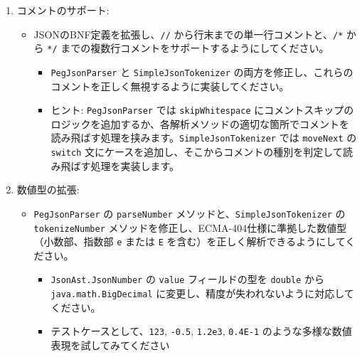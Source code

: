\begin{enumerate}
\item
  コメントのサポート:

\begin{itemize}
\item
  JSONのBNF定義を拡張し、\texttt{//}
  から行末までの単一行コメントと、\texttt{/*} から \texttt{*/}
  までの複数行コメントをサポートするようにしてください。

  \begin{itemize}
  \item
    \texttt{PegJsonParser} と \texttt{SimpleJsonTokenizer}
    の両方を修正し、これらのコメントを正しく無視するように実装してください。
  \item
    ヒント: \texttt{PegJsonParser} では \texttt{skipWhitespace}
    にコメントスキップのロジックを追加するか、各解析メソッドの適切な箇所でコメントを読み飛ばす処理を挟みます。\texttt{SimpleJsonTokenizer}
    では \texttt{moveNext} の \texttt{switch}
    文にケースを追加し、そこからコメントの種別を判定して読み飛ばす処理を実装します。
  \end{itemize}
\end{itemize}

\item
  数値型の拡張:

\begin{itemize}
\item
  \texttt{PegJsonParser} の \texttt{parseNumber}
  メソッドと、\texttt{SimpleJsonTokenizer} の \texttt{tokenizeNumber}
  メソッドを修正し、ECMA-404仕様に準拠した数値型（小数部、指数部
  \texttt{e} または \texttt{E}
  を含む）を正しく解析できるようにしてください。

  \begin{itemize}
  \item
    \texttt{JsonAst.JsonNumber} の \texttt{value} フィールドの型を
    \texttt{double} から \texttt{java.math.BigDecimal}
    に変更し、精度が失われないように対応してください。
  \item
    テストケースとして、\texttt{123}, \texttt{-0.5}, \texttt{1.2e3},
    \texttt{0.4E-1} のような多様な数値表現を試してみてください
  \end{itemize}
\end{itemize}
\end{enumerate}
